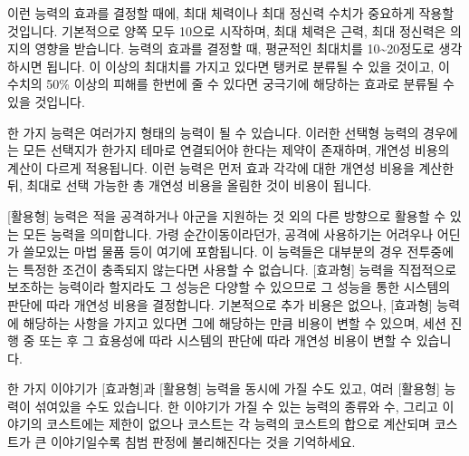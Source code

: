 \documentclass{report}
\begin{document}
	이런 능력의 효과를 결정할 때에, 최대 체력이나 최대 정신력 수치가 중요하게 작용할 것입니다. 기본적으로 양쪽 모두 10으로 시작하며, 최대 체력은 근력, 최대 정신력은 의지의 영향을 받습니다. 능력의 효과를 결정할 때, 평균적인 최대치를 10\textasciitilde20정도로 생각하시면 됩니다. 이 이상의 최대치를 가지고 있다면 탱커로 분류될 수 있을 것이고, 이 수치의 50\% 이상의 피해를 한번에 줄 수 있다면 궁극기에 해당하는 효과로 분류될 수 있을 것입니다.
	
	한 가지 능력은 여러가지 형태의 능력이 될 수 있습니다. 이러한 선택형 능력의 경우에는 모든 선택지가 한가지 테마로 연결되어야 한다는 제약이 존재하며, 개연성 비용의 계산이 다르게 적용됩니다. 이런 능력은 먼저 효과 각각에 대한 개연성 비용을 계산한 뒤, 최대로 선택 가능한 총 개연성 비용을 올림한 것이 비용이 됩니다.
	
	[활용형] 능력은 적을 공격하거나 아군을 지원하는 것 외의 다른 방향으로 활용할 수 있는 모든 능력을 의미합니다. 가령 순간이동이라던가, 공격에 사용하기는 어려우나 어딘가 쓸모있는 마법 물품 등이 여기에 포함됩니다. 이 능력들은 대부분의 경우 전투중에는 특정한 조건이 충족되지 않는다면 사용할 수 없습니다. [효과형] 능력을 직접적으로 보조하는 능력이라 할지라도 그 성능은 다양할 수 있으므로 그 성능을 통한 시스템의 판단에 따라 개연성 비용을 결정합니다. 기본적으로 추가 비용은 없으나, [효과형] 능력에 해당하는 사항을 가지고 있다면 그에 해당하는 만큼 비용이 변할 수 있으며, 세션 진행 중 또는 후 그 효용성에 따라 시스템의 판단에 따라 개연성 비용이 변할 수 있습니다.
	
	한 가지 이야기가 [효과형]과 [활용형] 능력을 동시에 가질 수도 있고, 여러 [활용형] 능력이 섞여있을 수도 있습니다. 한 이야기가 가질 수 있는 능력의 종류와 수, 그리고 이야기의 코스트에는 제한이 없으나 코스트는 각 능력의 코스트의 합으로 계산되며 코스트가 큰 이야기일수록 침범 판정에 불리해진다는 것을 기억하세요.
	
	\bigskip
	
\end{document}
